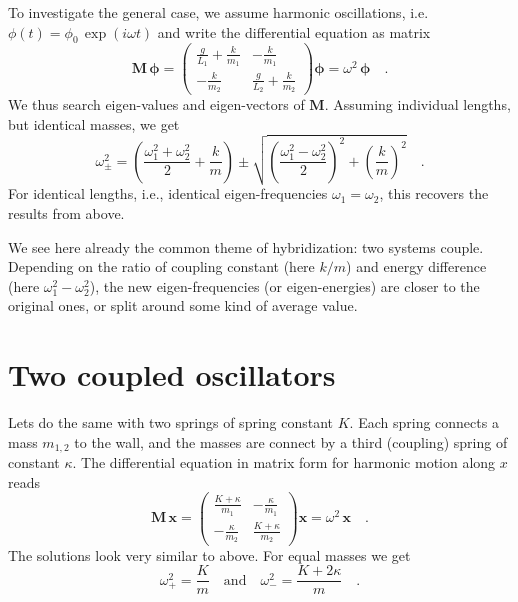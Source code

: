 To investigate the general case, we assume harmonic oscillations, i.e. $\phi(t) = \phi_0 \, \exp (i \omega t)$ and write the differential equation as matrix
\begin{equation} \boldsymbol{M \, \phi} = 
\begin{pmatrix}
  \frac{g}{L_1} + \frac{k}{m_1}& - \frac{k}{m_1}\\
 - \frac{k}{m_2} & \frac{g}{L_2} + \frac{k}{m_2}
\end{pmatrix}  \boldsymbol{\phi} =  \omega^2 \, \boldsymbol{\phi}
\quad .
\end{equation}
We thus search eigen-values and eigen-vectors of $\boldsymbol{M}$. Assuming individual lengths, but identical masses, we get
\begin{equation}
 \omega_{\pm}^2 = \left( \frac{\omega_1^2 + \omega_2^2}{2} + \frac{k}{m} \right)
  \pm \sqrt{ \left( \frac{\omega_1^2 - \omega_2^2}{2} \right)^2 + \left( \frac{k}{m} \right)^2 } \quad .
\end{equation}
For identical lengths, i.e., identical eigen-frequencies $\omega_1 = \omega_2$, this recovers the results from above.


We see here already the common theme of hybridization: two systems couple. Depending on the ratio of coupling constant (here $k/m$) and energy difference (here $\omega_1^2 - \omega_2^2$), the new eigen-frequencies (or eigen-energies) are closer to the original ones, or split around some kind of average value.


\section{Two coupled oscillators}

Lets do the same with two springs of spring constant $K$. Each spring connects a mass $m_{1,2}$ to the wall, and the masses are connect by a third (coupling) spring of constant $\kappa$. The differential equation in matrix form for harmonic motion along $x$ reads 
\begin{equation} \boldsymbol{M \, x} = 
  \begin{pmatrix}
     \frac{K + \kappa}{m_1} & - \frac{\kappa}{m_1}\\
  -  \frac{\kappa}{m_2} &  \frac{K + \kappa}{m_2}
  \end{pmatrix}  \boldsymbol{x} =  \omega^2 \, \boldsymbol{x}
  \quad .
  \end{equation}
The solutions look very similar to above. For equal masses we get
\begin{equation}
  \omega_{+}^2 = \frac{K}{m} \quad \text{and} \quad 
   \omega_{-}^2 = \frac{K + 2 \kappa}{m}  \quad .
 \end{equation}




